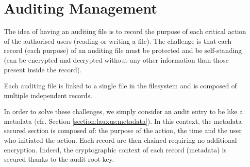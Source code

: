 \documentclass[../main.tex]{subfiles}
\begin{document}
\section{Auditing Management}
\label{section:lauxus:audit}
\par The idea of having an auditing file is to record the purpose of each critical action of the authorised users (reading or writing a file). The challenge is that each record (each purpose) of an auditing file must be protected and be self-standing (can be encrypted and decrypted without any other information than those present inside the record).
\par Each auditing file is linked to a single file in the filesystem and is composed of multiple independent records.
\par In order to solve these challenges, we simply consider an audit entry to be like a metadata (cfr. Section \ref{section:lauxus:metadata}). In this context, the metadata secured section is composed of: the purpose of the action, the time and the user who initiated the action. Each record are then chained requiring no additional encryption. Indeed, the cryptographic context of each record (metadata) is secured thanks to the audit root key.
\end{document}
